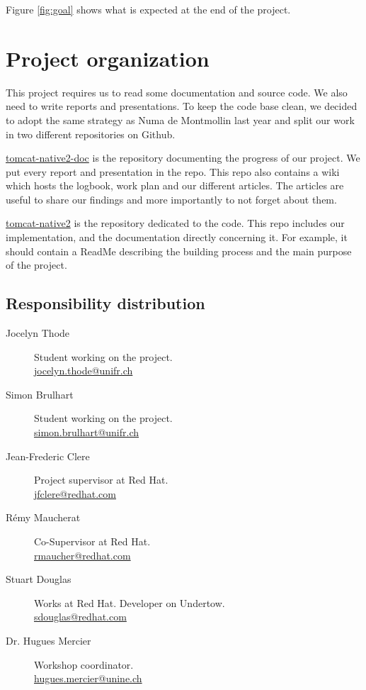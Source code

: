 \documentclass[11pt,a4paper,bibliography=totocnumbered]{scrartcl}
\def\theclient{Red Hat}
\begin{document}
Figure \ref{fig:goal} shows what is expected at the end of the project.

\section{Project organization}
\label{sec:org}

This project requires us to read some documentation and source code. We also need to write reports and presentations. To keep the code base clean, we decided to adopt the same strategy as Numa de Montmollin last year and split our work in two different repositories on Github.

\href{https://github.com/jocelynthode/tomcat-native2-doc}{tomcat-native2-doc} is the repository documenting the progress of our project. We put every report and presentation in the repo. This repo also contains a wiki which hosts the logbook, work plan and our different articles. The articles are useful to share our findings and more importantly to not forget about them.

\href{https://github.com/jocelynthode/tomcat-native2}{tomcat-native2} is the repository dedicated to the code. This repo includes our implementation, and the documentation directly concerning it. For example, it should contain a ReadMe describing the building process and the main purpose of the project.

\subsection{Responsibility distribution}

\begin{description}
\item[Jocelyn Thode] Student working on the project.\\
\href{mailto:jocelyn.thode@unifr.ch}{jocelyn.thode@unifr.ch}

\item[Simon Brulhart] Student working on the project.\\
\href{mailto:simon.brulhart@unifr.ch}{simon.brulhart@unifr.ch}

\item[Jean-Frederic Clere] Project supervisor at \theclient{}. \\
\href{mailto:jfclere@redhat.com}{jfclere@redhat.com}

\item[Rémy Maucherat] Co-Supervisor at \theclient{}.\\
\href{mailto:rmaucher@redhat.com}{rmaucher@redhat.com}

\item[Stuart Douglas] Works at \theclient{}.
Developer on Undertow.\\
\href{mailto:sdouglas@redhat.com}{sdouglas@redhat.com}

\item[Dr. Hugues Mercier] Workshop coordinator.\\
\href{mailto:hugues.mercier@unine.ch}{hugues.mercier@unine.ch}
\end{description}
\end{document}
